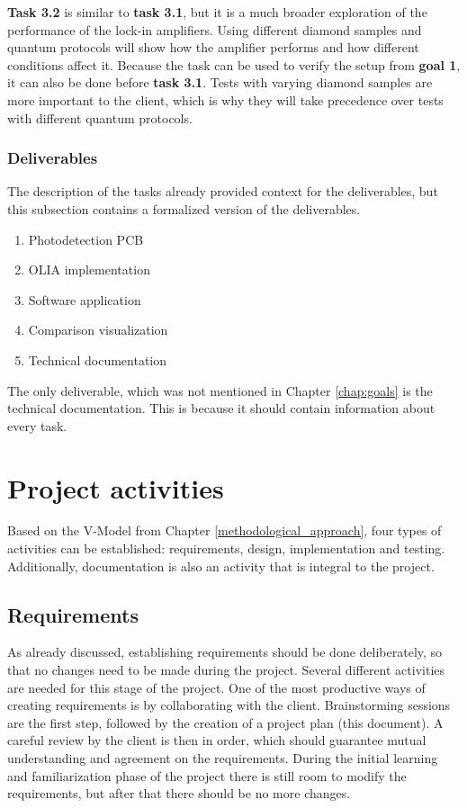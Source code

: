 \documentclass{report}
\begin{document}
	\textbf{Task 3.2} is similar to \textbf{task 3.1}, but it is a much broader exploration of the performance of the lock-in amplifiers. Using different diamond samples and quantum protocols will show how the amplifier performs and how different conditions affect it. Because the task can be used to verify the setup from \textbf{goal 1}, it can also be done before \textbf{task 3.1}. Tests with varying diamond samples are more important to the client, which is why they will take precedence over tests with different quantum protocols.
	
	
	\subsection{Deliverables}
	The description of the tasks already provided context for the deliverables, but this subsection contains a formalized version of the deliverables.
	
	\begin{enumerate}
		\item Photodetection PCB 
		\item OLIA implementation
		\item Software application
		\item Comparison visualization
		\item Technical documentation
	\end{enumerate}
	
	The only deliverable, which was not mentioned in Chapter \ref{chap:goals} is the technical documentation. This is because it should contain information about every task.
		
	
	\chapter{Project activities}
	Based on the V-Model from Chapter \ref{methodological_approach}, four types of activities can be established: requirements, design, implementation and testing. Additionally, documentation is also an activity that is integral to the project.
	
	\section{Requirements}
	As already discussed, establishing requirements should be done deliberately, so that no changes need to be made during the project. Several different activities are needed for this stage of the project. One of the most productive ways of creating requirements is by collaborating with the client. Brainstorming sessions are the first step, followed by the creation of a project plan (this document). A careful review by the client is then in order, which should guarantee mutual understanding and agreement on the requirements. During the initial learning and familiarization phase of the project there is still room to modify the requirements, but after that there should be no more changes.
	
\end{document}
